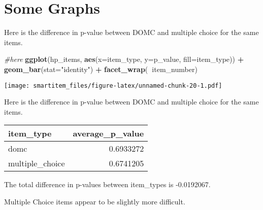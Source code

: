 \documentclass[]{book}
\newenvironment{Shaded}{\begin{snugshade}}{\end{snugshade}}
\newcommand{\KeywordTok}[1]{\textcolor[rgb]{0.13,0.29,0.53}{\textbf{#1}}}
\newcommand{\DataTypeTok}[1]{\textcolor[rgb]{0.13,0.29,0.53}{#1}}
\newcommand{\StringTok}[1]{\textcolor[rgb]{0.31,0.60,0.02}{#1}}
\newcommand{\CommentTok}[1]{\textcolor[rgb]{0.56,0.35,0.01}{\textit{#1}}}
\newcommand{\OtherTok}[1]{\textcolor[rgb]{0.56,0.35,0.01}{#1}}
\newcommand{\OperatorTok}[1]{\textcolor[rgb]{0.81,0.36,0.00}{\textbf{#1}}}
\newcommand{\NormalTok}[1]{#1}
\theoremstyle{definition}
\theoremstyle{definition}
\theoremstyle{definition}
\theoremstyle{remark}
\begin{document}
\section{Some Graphs}\label{some-graphs}

Here is the difference in p-value between DOMC and multiple choice for
the same items.

\begin{Shaded}
\begin{Highlighting}[]
\CommentTok{#here}
\KeywordTok{ggplot}\NormalTok{(hp_items, }\KeywordTok{aes}\NormalTok{(}\DataTypeTok{x=}\NormalTok{item_type, }\DataTypeTok{y=}\NormalTok{p_value, }\DataTypeTok{fill=}\NormalTok{item_type)) }\OperatorTok{+}\StringTok{ }\KeywordTok{geom_bar}\NormalTok{(}\DataTypeTok{stat=}\StringTok{"identity"}\NormalTok{)  }\OperatorTok{+}\StringTok{ }\KeywordTok{facet_wrap}\NormalTok{(}\OperatorTok{~}\NormalTok{item_number)}
\end{Highlighting}
\end{Shaded}

\texttt{[image: smartitem\_files/figure-latex/unnamed-chunk-20-1.pdf]}

Here is the difference in p-value between DOMC and multiple choice for
the same items.

\begin{Shaded}
\end{Shaded}

\begin{tabular}{l|r}
\hline
item\_type & average\_p\_value\\
\hline
domc & 0.6933272\\
\hline
multiple\_choice & 0.6741205\\
\hline
\end{tabular}

The total difference in p-values between item\_types is -0.0192067.

Multiple Choice items appear to be slightly more difficult.


\end{document}
